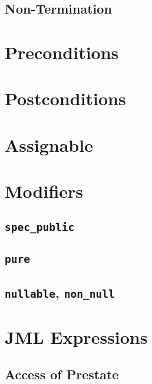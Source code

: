 \documentclass[a4paper, 11pt, accentcolor = tud3b]{tudreport}
\begin{document}
			\subsection{Non-Termination} %

		\section{Preconditions} %

		\section{Postconditions} %

		\section{Assignable} %

		\section{Modifiers} %

			\subsection{\texttt{spec\_public}} %

			\subsection{\texttt{pure}} %

			\subsection{\texttt{nullable}, \texttt{non\_null}} %

		\section{JML Expressions} %

			\subsection{Access of Prestate} %
\end{document}
